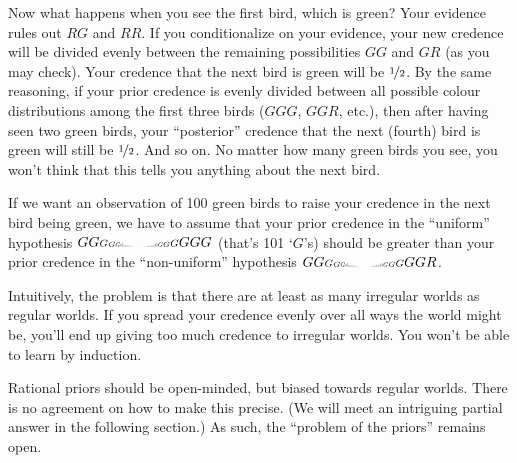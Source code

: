 Now what happens when you see the first bird, which is green? Your evidence
rules out $RG$ and $RR$. If you conditionalize on your evidence, your new
credence will be divided evenly between the remaining possibilities $GG$ and
$GR$ (as you may check). Your credence that the next bird is green will be
$\nicefrac{1}{2}$. By the same reasoning, if your prior credence is evenly
divided between all possible colour distributions among the first three birds
($GGG$, $GGR$, etc.), then after having seen two green birds, your ``posterior''
credence that the next (fourth) bird is green will still be $\nicefrac{1}{2}$. And so
on. No matter how many green birds you see, you won't think that this tells you
anything about the next bird.

If we want an observation of 100 green birds to raise your credence in the next
bird being green, we have to assume that your prior credence in the ``uniform''
hypothesis
$GG
{\scriptstyle G}
{\scriptscriptstyle G}
\scaleto{G}{3pt}
\scaleto{G}{2pt}
\scaleto{GG}{1.2pt}
\scaleto{GG}{0.8pt}
\scaleto{GG}{0.5pt}
\scaleto{GG}{0.3pt}
\scaleto{GGGGGG}{0.2pt}
\scaleto{
  GGGGGGGGGG
  GGGGGGGGGG
  GGGGGGGGGG
  GGGGGGGGGG
  GGGGGGGGGG
  GGGGGGGGGG
}{0.1pt}
\scaleto{GGGGGG}{0.2pt}
\scaleto{GG}{0.3pt}
\scaleto{GG}{0.5pt}
\scaleto{GG}{0.8pt}
\scaleto{GG}{1.2pt}
\scaleto{G}{2pt}
\scaleto{G}{3pt}
{\scriptscriptstyle G}{\scriptstyle G}GGG$
(that's 101 `$G$'s) should be greater than your prior
credence in the ``non-uniform'' hypothesis
$GG
{\scriptstyle G}
{\scriptscriptstyle G}
\scaleto{G}{3pt}
\scaleto{G}{2pt}
\scaleto{GG}{1.2pt}
\scaleto{GG}{0.8pt}
\scaleto{GG}{0.5pt}
\scaleto{GG}{0.3pt}
\scaleto{GGGGGG}{0.2pt}
\scaleto{
  GGGGGGGGGG
  GGGGGGGGGG
  GGGGGGGGGG
  GGGGGGGGGG
  GGGGGGGGGG
  GGGGGGGGGG
}{0.1pt}
\scaleto{GGGGGGG}{0.2pt}
\scaleto{GG}{0.3pt}
\scaleto{GG}{0.5pt}
\scaleto{GG}{0.8pt}
\scaleto{GG}{1.2pt}
\scaleto{G}{2pt}
\scaleto{G}{3pt}
{\scriptscriptstyle G}{\scriptstyle G}GGR$.

Intuitively, the problem is that there are at least as many irregular worlds as
regular worlds. If you spread your credence evenly over all ways the world might
be, you'll end up giving too much credence to irregular worlds. You won't be
able to learn by induction.

Rational priors should be open-minded, but biased towards regular worlds. There
is no agreement on how to make this precise. (We will meet an intriguing partial
answer in the following section.) As such, the ``problem of the priors'' remains
open.

